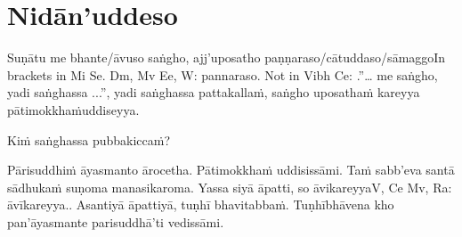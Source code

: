 
\section{Nidān'uddeso}
\label{nidan'uddeso}

\ifninebythirteenversion\vspace{0.2em}\fi
\ifafiveversion\vspace{0.2em}\fi

Suṇātu me bhante/āvuso saṅgho, ajj'uposatho paṇṇaraso/cātuddaso/sāmaggo\makeatletter\hyperlink{endnote15-appendix}\makeatother In brackets in Mi Se. Dm, Mv Ee, W: pannaraso. Not in Vibh Ce: .”… me saṅgho, yadi saṅghassa ...”, yadi saṅghassa pattakallaṁ, saṅgho uposathaṁ kareyya pātimokkhaṁ\makeatletter\hyperlink{endnote14-appendix}\makeatother uddiseyya.

\makeatletter\hyperlink{endnote-appendix}\makeatother

Kiṁ saṅghassa pubbakiccaṁ?

Pārisuddhiṁ āyasmanto ārocetha. Pātimokkhaṁ uddisissāmi. Taṁ sabb'eva santā sādhukaṁ suṇoma manasikaroma. Yassa siyā āpatti, so āvikareyya\makeatletter\hyperlink{endnote-appendix}\makeatother V, Ce Mv, Ra: āvīkareyya.. Asantiyā āpattiyā, tuṇhī bhavitabbaṁ. Tuṇhībhāvena kho pan'āyasmante parisuddhā'ti vedissāmi.

